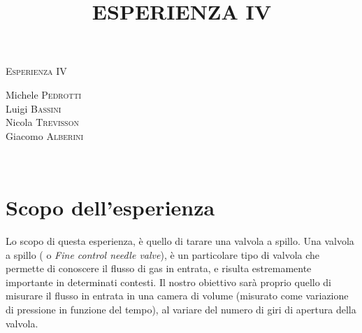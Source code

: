 \documentclass[11pt]{article}
\begin{document}
\begin{center}



\textsc{\Huge Esperienza IV}\\[0.5cm]



\large
\title{ESPERIENZA IV}

Michele \textsc{Pedrotti}\\
Luigi \textsc{Bassini}\\
Nicola \textsc{Trevisson}\\
Giacomo \textsc{Alberini}






\end{center}


~\\
\section{Scopo dell'esperienza}
Lo scopo di questa esperienza, è quello di tarare una valvola a spillo. Una valvola a spillo ( o \textit{Fine control needle valve}), è un particolare tipo di valvola che permette di conoscere il flusso di gas in entrata, e risulta estremamente importante in determinati contesti. Il nostro obiettivo sarà proprio quello di misurare il flusso in entrata in una camera di volume (misurato come variazione di pressione in funzione del tempo), al variare del numero di giri di apertura della valvola.
\end{document}
